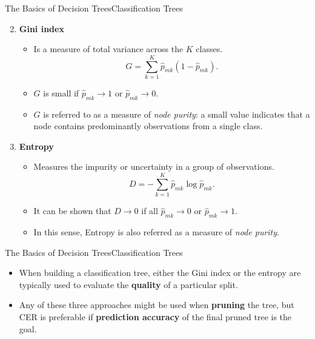 \begin{frame}{The Basics of Decision Trees}{Classification Trees}

\begin{enumerate}
    \setcounter{enumi}{1}
    \item \textbf{Gini index} \pause 
    \begin{itemize}
        \item Is a measure of total variance across the $K$ classes. \pause 
        \begin{equation*}
            G = \sum_{k=1}^K \hat{p}_{mk}(1-\hat{p}_{mk}).
        \end{equation*} \pause
        \item $G$ is small if $\hat{p}_{mk} \rightarrow 1$ or $\hat{p}_{mk} \rightarrow 0$. \pause
        \item $G$ is referred to as a measure of \textit{node purity}: \pause a small value indicates that a node contains predominantly observations from a single class. \pause
    \end{itemize}

    \item \textbf{Entropy} \pause 
    \begin{itemize}
        \item Measures the impurity or uncertainty in a group of observations. \pause 
        \begin{equation*}
                D = - \sum_{k=1}^K \hat{p}_{mk} \log \hat{p}_{mk}.
        \end{equation*} \pause
        \item It can be shown that $D \rightarrow 0$ if all $\hat{p}_{mk} \rightarrow 0$ or $\hat{p}_{mk} \rightarrow 1$. \pause
        \item In this sense, Entropy is also referred as a measure of \textit{node purity}.
        
    \end{itemize}
\end{enumerate}

\end{frame}


\begin{frame}{The Basics of Decision Trees}{Classification Trees}

    \begin{itemize}
        \item When building a classification tree, either the Gini index or the entropy are typically used to evaluate the \textbf{quality} of a particular split. \pause 

        \item Any of these three approaches might be used when \textbf{pruning} the tree, but CER is preferable if \textbf{prediction accuracy} of the final pruned tree is the goal. 
    \end{itemize}

\end{frame}

